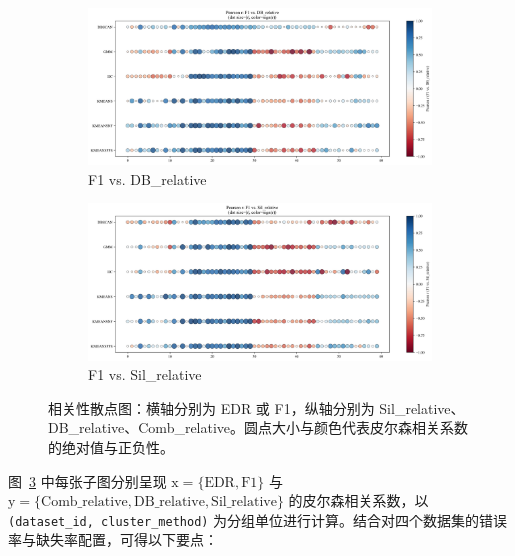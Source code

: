 \documentclass[10pt]{article} %
\numberwithin{equation}{section}
\begin{document}
\begin{enumerate}[label=(\alph*)]
\begin{figure}[htbp]
    \begin{subfigure}[b]{0.45\linewidth}
        \centering
        \includegraphics[width=\linewidth]{figures/point graph/dot_F1_vs_DB_relative_sorted.pdf}
        \caption{F1 vs. DB\_relative}
        \label{fig:dot_f1_db}
    \end{subfigure}
    \hfill
    \begin{subfigure}[b]{0.45\linewidth}
        \centering
        \includegraphics[width=\linewidth]{figures/point graph/dot_F1_vs_Sil_relative_sorted.pdf}
        \caption{F1 vs. Sil\_relative}
        \label{fig:dot_f1_sil}
    \end{subfigure}

    \caption{相关性散点图：横轴分别为 EDR 或 F1，纵轴分别为 Sil\_relative、DB\_relative、Comb\_relative。圆点大小与颜色代表皮尔森相关系数的绝对值与正负性。}
    \label{fig:correlation_scatter_six}
\end{figure}

图~\ref{fig:correlation_scatter_six} 中每张子图分别呈现 \(\mathrm{x}=\{\text{EDR}, \text{F1}\}\) 与 \(\mathrm{y}=\{\text{Comb\_relative}, \text{DB\_relative}, \text{Sil\_relative}\}\) 的皮尔森相关系数，以 \texttt{(dataset\_id, cluster\_method)} 为分组单位进行计算。结合对四个数据集的错误率与缺失率配置，可得以下要点：


\end{enumerate}
\end{document}
